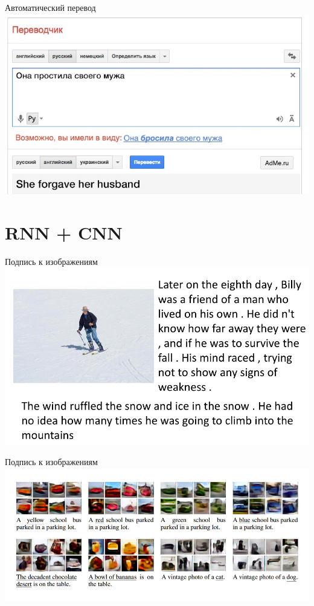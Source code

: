 \documentclass[10pt]{beamer}
\begin{document}
\begin{frame}{Автоматический перевод}
  \centering 
  \includegraphics[width=0.9 \textwidth, keepaspectratio = true]{images/translate}   
\end{frame}

\section{RNN + CNN}

{
\begin{frame}{Подпись к изображениям}
  \centering 
  \includegraphics[width=0.9 \textwidth, keepaspectratio = true]{images/subscr}   
\end{frame}
}

{
\begin{frame}{Подпись к изображениям}
  \centering 
  \includegraphics[width=0.9 \textwidth, keepaspectratio = true]{images/image_gen}   
\end{frame}
}
\end{document}
